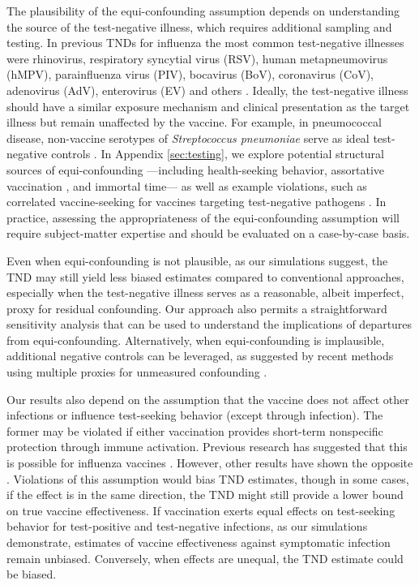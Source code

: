 \documentclass[11pt]{article}
\begin{document}
The plausibility of the equi-confounding assumption depends on understanding the source of the test-negative illness, which requires additional sampling and testing.  In previous TNDs for influenza the most common test-negative illnesses were rhinovirus, respiratory syncytial virus (RSV), human metapneumovirus (hMPV), parainfluenza virus (PIV), bocavirus (BoV), coronavirus (CoV), adenovirus (AdV), enterovirus (EV) and others \cite{chua_use_2020-1}. Ideally, the test-negative illness should have a similar exposure mechanism and clinical presentation as the target illness but remain unaffected by the vaccine. For example, in pneumococcal disease, non-vaccine serotypes of \textit{Streptococcus pneumoniae} serve as ideal test-negative controls \cite{broome_pneumococcal_1980}.  In Appendix \ref{sec:testing}, we explore potential structural sources of equi-confounding ---including health-seeking behavior, assortative vaccination \cite{zivich_assortativity_2021}, and immortal time--- as well as example violations, such as correlated vaccine-seeking for vaccines targeting test-negative pathogens \cite{payne_impact_2023}. In practice, assessing the appropriateness of the equi-confounding assumption will require subject-matter expertise and should be evaluated on a case-by-case basis.

Even when equi-confounding is not plausible, as our simulations suggest, the TND may still yield less biased estimates compared to conventional approaches, especially when the test-negative illness serves as a reasonable, albeit imperfect, proxy for residual confounding. Our approach also permits a straightforward sensitivity analysis that can be used to understand the implications of departures from equi-confounding. Alternatively, when equi-confounding is implausible, additional negative controls can be leveraged, as suggested by recent methods using multiple proxies for unmeasured confounding \cite{li_double_2023}.

Our results also depend on the assumption that the vaccine does not affect other infections or influence test-seeking behavior (except through infection). The former may be violated if either vaccination provides short-term nonspecific protection through immune activation. Previous research has suggested that this is possible for influenza vaccines \cite{cowling_increased_2012}. However, other results have shown the opposite \cite{sundaram_influenza_2013}. Violations of this assumption would bias TND estimates, though in some cases, if the effect is in the same direction, the TND might still provide a lower bound on true vaccine effectiveness. If vaccination exerts equal effects on test-seeking behavior for test-positive and test-negative infections, as our simulations demonstrate, estimates of vaccine effectiveness against symptomatic infection remain unbiased. Conversely, when effects are unequal, the TND estimate could be biased. 
\end{document}

